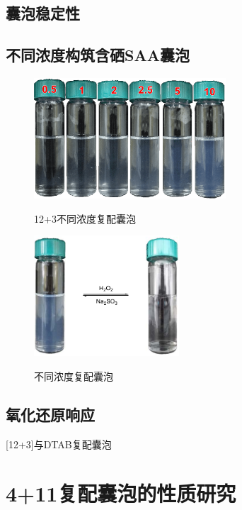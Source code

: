 \documentclass[bachelor,fandolfonts,replaceperiod]{jnuthesis} %
\begin{document}
    \subsection{囊泡稳定性}
    
    \subsection{不同浓度构筑含硒SAA囊泡}

    \begin{figure}[htbp]
        \centering
        \includegraphics[height=4.5cm]{figure/123concentration.png}\\
        \caption{12+3不同浓度复配囊泡}\label{fig:vesicle-concentration}
    \end{figure}

    \begin{figure}[htbp]
        \centering
        \includegraphics[height=4.5cm]{figure/redox.pdf}\\
        \caption{不同浓度复配囊泡}\label{fig:vesicle-redox}
    \end{figure}

    \subsection{氧化还原响应}
    
    
    [12+3]与DTAB复配囊泡
    
    \section{4+11复配囊泡的性质研究}
\end{document}
